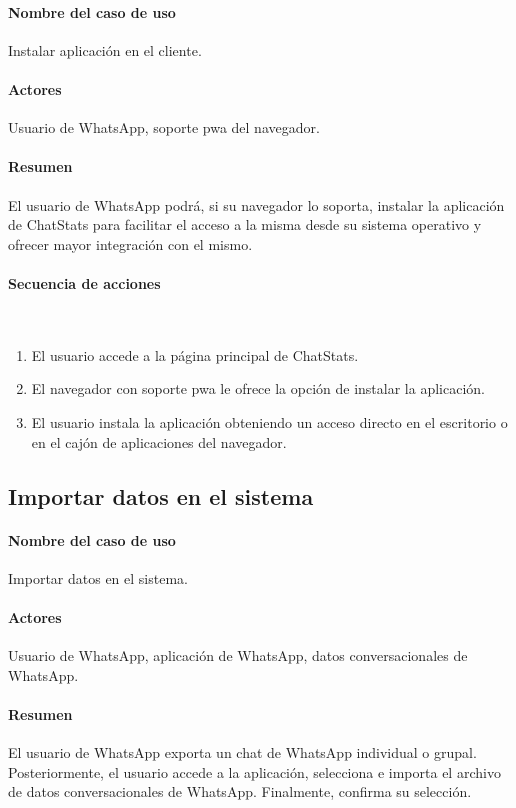 \paragraph{Nombre del caso de uso} Instalar aplicación en el cliente.
\paragraph{Actores} Usuario de WhatsApp, soporte \acrshort{pwa} del navegador.
\paragraph{Resumen} El usuario de WhatsApp podrá, si su navegador lo soporta, instalar la aplicación de ChatStats para facilitar el acceso a la misma desde su sistema operativo y ofrecer mayor integración con el mismo.
\paragraph{Secuencia de acciones}\mbox{}\\

\begin{enumerate}
	\item El usuario accede a la página principal de ChatStats.
	\item El navegador con soporte \acrshort{pwa} le ofrece la opción de instalar la aplicación.
	\item El usuario instala la aplicación obteniendo un acceso directo en el escritorio o en el cajón de aplicaciones del navegador.
\end{enumerate}

\subsection{Importar datos en el sistema}

\paragraph{Nombre del caso de uso} Importar datos en el sistema.
\paragraph{Actores} Usuario de WhatsApp, aplicación de WhatsApp, datos conversacionales de WhatsApp.
\paragraph{Resumen} El usuario de WhatsApp exporta un chat de WhatsApp individual o grupal. Posteriormente, el usuario accede a la aplicación, selecciona e importa el archivo de datos conversacionales de WhatsApp. Finalmente, confirma su selección.
